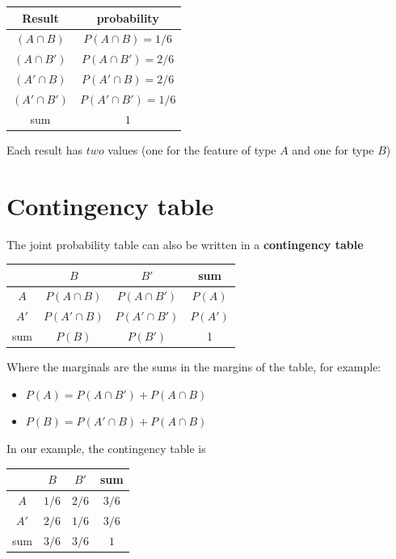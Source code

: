 \documentclass[
]{book}
\providecommand{\tightlist}{%
  \setlength{\itemsep}{0pt}\setlength{\parskip}{0pt}}
\begin{document}
\begin{longtable}[]{@{}cc@{}}
\toprule\noalign{}
Result & probability \\
\midrule\noalign{}
\endhead
\bottomrule\noalign{}
\endlastfoot
\((A\cap B)\) & \(P(A \cap B)=1/6\) \\
\((A\cap B')\) & \(P(A \cap B')=2/6\) \\
\((A'\cap B)\) & \(P(A' \cap B)=2/6\) \\
\((A'\cap B')\) & \(P(A' \cap B')=1/6\) \\
sum & \(1\) \\
\end{longtable}

Each result has \(two\) values (one for the feature of type \(A\) and one for type \(B\))

\hypertarget{contingency-table}{%
\section{Contingency table}\label{contingency-table}}

The joint probability table can also be written in a \textbf{contingency table}

\begin{longtable}[]{@{}cccc@{}}
\toprule\noalign{}
& \(B\) & \(B'\) & sum \\
\midrule\noalign{}
\endhead
\bottomrule\noalign{}
\endlastfoot
\(A\) & \(P(A \cap B )\) & \(P(A\cap B' )\) & \(P(A)\) \\
\(A'\) & \(P(A'\cap B )\) & \(P(A'\cap B' )\) & \(P(A')\) \\
sum & \(P(B)\) & \(P(B')\) & 1 \\
\end{longtable}

Where the marginals are the sums in the margins of the table, for example:

\begin{itemize}
\tightlist
\item
  \(P(A)=P(A \cap B') + P(A \cap B)\)
\item
  \(P(B)=P(A' \cap B) +P(A \cap B)\)
\end{itemize}

In our example, the contingency table is

\begin{longtable}[]{@{}cccc@{}}
\toprule\noalign{}
& \(B\) & \(B'\) & sum \\
\midrule\noalign{}
\endhead
\bottomrule\noalign{}
\endlastfoot
\(A\) & \(1/6\) & \(2/6\) & \(3/6\) \\
\(A'\) & \(2/6\) & \(1/6\) & \(3/6\) \\
sum & \(3/6\) & \(3/6\) & \(1\) \\
\end{longtable}
\end{document}
